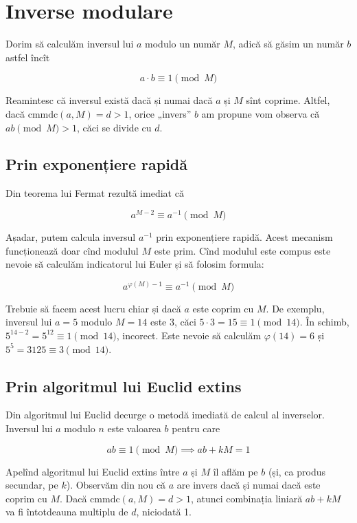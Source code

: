 \documentclass[../main.tex]{subfiles}
\begin{document}
\section{Inverse modulare}

Dorim să calculăm inversul lui $a$ modulo un număr $M$, adică să găsim un număr $b$ astfel încît

$$a \cdot b \equiv 1 \pmod{M}$$

Reamintesc că inversul există dacă și numai dacă $a$ și $M$ sînt coprime. Altfel, dacă $\text{cmmdc}(a, M) = d > 1$, orice „invers” $b$ am propune vom observa că $ab \pmod M > 1$, căci se divide cu $d$.

\subsection{Prin exponențiere rapidă}

Din teorema lui Fermat rezultă imediat că

$$a^{M-2} \equiv a^{-1} \pmod{M}$$

Așadar, putem calcula inversul $a^{-1}$ prin exponențiere rapidă. Acest mecanism funcționează doar cînd modulul $M$ este prim. Cînd modulul este compus este nevoie să calculăm indicatorul lui Euler și să folosim formula:

$$a^{\varphi(M)-1} \equiv a^{-1} \pmod{M}$$

Trebuie să facem acest lucru chiar și dacă $a$ este coprim cu $M$. De exemplu, inversul lui $a = 5$ modulo $M = 14$ este $3$, căci $5 \cdot 3 = 15 \equiv 1 \pmod{14}$. În schimb, $5^{14-2} = 5^{12} \equiv 1 \pmod{14}$, incorect. Este nevoie să calculăm $\varphi(14) = 6$ și $5^5 = 3125 \equiv 3 \pmod{14}$.

\subsection{Prin algoritmul lui Euclid extins}

Din algoritmul lui Euclid decurge o metodă imediată de calcul al inverselor. Inversul lui $a$ modulo $n$ este valoarea $b$ pentru care

$$ab \equiv 1 \pmod{M} \implies ab + kM = 1$$

Apelînd algoritmul lui Euclid extins între $a$ și $M$ îl aflăm pe $b$ (și, ca produs secundar, pe $k$). Observăm din nou că $a$ are invers dacă și numai dacă este coprim cu $M$. Dacă $\text{cmmdc}(a, M) = d > 1$, atunci combinația liniară $ab + kM$ va fi întotdeauna multiplu de $d$, niciodată 1.
\end{document}
